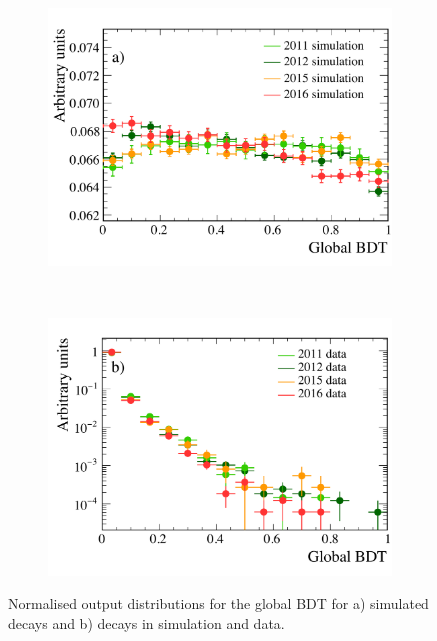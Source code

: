 \begin{figure}[tbp]
    \centering
    \begin{subfigure}[b]{0.48\textwidth}
        \includegraphics[width=\textwidth]{./Figs/Selection/BDTflat_signal.pdf}
    \end{subfigure}
    ~ %
    \begin{subfigure}[b]{0.48\textwidth}
       \includegraphics[width=\textwidth]{./Figs/Selection/BDTflat_bkgnd.pdf}
    \end{subfigure}
    \caption{Normalised output distributions for the global BDT for a) \bsmumu simulated decays and b) \bbbarmumux decays in simulation and data.}
    \label{fig:FlatteningBDT}
\end{figure}


